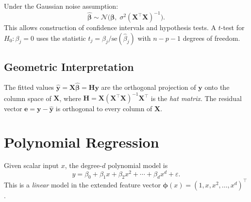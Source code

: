\begin{proposition}
Under the Gaussian noise assumption:
\[
    \hat{\bm{\beta}} \sim \mathcal{N}\bigl(\bm{\beta},\;\sigma^2(\bm{X}^\top\bm{X})^{-1}\bigr).
\]
This allows construction of confidence intervals and hypothesis tests. A $t$-test for $H_0: \beta_j = 0$ uses the statistic $t_j = \hat{\beta}_j / \text{se}(\hat{\beta}_j)$ with $n-p-1$ degrees of freedom.
\end{proposition}

\subsection{Geometric Interpretation}

\begin{intuition}[title=\textbf{Projection Viewpoint}]
The fitted values $\hat{\bm{y}} = \bm{X}\hat{\bm{\beta}} = \bm{H}\bm{y}$ are the orthogonal projection of $\bm{y}$ onto the column space of $\bm{X}$, where $\bm{H} = \bm{X}(\bm{X}^\top\bm{X})^{-1}\bm{X}^\top$ is the \emph{hat matrix}. The residual vector $\bm{e} = \bm{y} - \hat{\bm{y}}$ is orthogonal to every column of $\bm{X}$.
\end{intuition}

\begin{center}
\end{center}

\section{Polynomial Regression}

\begin{definition}
Given scalar input $x$, the degree-$d$ polynomial model is
\[
    y = \beta_0 + \beta_1 x + \beta_2 x^2 + \cdots + \beta_d x^d + \varepsilon.
\]
This is a \emph{linear} model in the extended feature vector $\bm{\phi}(x) = (1, x, x^2, \ldots, x^d)^\top$.
\end{definition}


